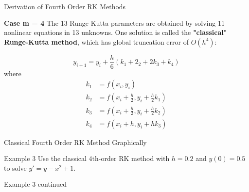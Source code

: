 \documentclass[12pt]{beamer}
\begin{document}
\begin{frame}{Derivation of Fourth Order RK Methods}  

{\bf Case  m = 4}
The 13 Runge-Kutta parameters are obtained by solving 11 nonlinear equations in 13 unknowns. One solution is called the {\bf "classical" Runge-Kutta method}, which has global truncation error of $O(h^4)$:

\[
y_{i+1}=y_i+\frac{h}{6}(k_1+2_2+2k_3+k_4)
\]
where
\begin{align*}
k_1 &= f(x_i,y_i) \\
k_2 & = f\left(x_i+\frac{h}{2},y_i+\frac{h}{2}k_1\right) \\
k_3 & = f\left(x_i+\frac{h}{2},y_i+\frac{h}{2}k_2\right) \\
k_4 &= f(x_i+h,y_i+hk_3)
\end{align*}
\end{frame} 

\begin{frame}{Classical Fourth Order RK Method Graphically}  

\end{frame} 

\begin{frame}{Example 3} 
Use the classical 4th-order RK method with $h=0.2$ and $y(0)=0.5$ to solve $y'=y-x^2+1$.
\vspace{3 in}
\end{frame} 

\begin{frame}{Example 3 continued} 

\end{frame} 
\end{document}
